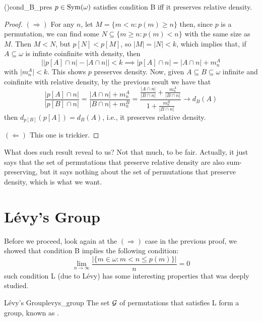 \begin{theorem}{(\cite{brech})}{cond_B_pres}
    $p\in\mathrm{Sym}(\omega)$ satisfies condition B iff it preserves relative density.
\end{theorem}

\begin{proof}
    $(\Rightarrow)$ For any $n$, let $M=\{m<n:p(m)\geq n\}$ then, since $p$ is a permutation, we can find some $N\subseteq\{m\geq n:p(m)<n\}$ with the same size as $M$. Then $M<N$, but $p[N]<p[M]$, so $\lvert M\rvert=\lvert N\rvert<k$, which implies that, if $A\subseteq\omega$ is infinte coinfinite with density, then
    $$\lvert\lvert p[A]\cap n\rvert-\lvert A\cap n\rvert\rvert<k\implies \lvert p[A]\cap n\rvert=\lvert A\cap n\rvert+m_n^A$$
    with $\lvert m_n^A\rvert<k$. This shows $p$ preserves density. Now, given $A\subseteq B\subseteq \omega$ infinite and coinfinite with relative density, by the previous result we have that
    $$\frac{\lvert p[A]\cap n\rvert}{\lvert p[B]\cap n\rvert}=\frac{\lvert A\cap n\rvert+m_n^A}{\lvert B\cap n\rvert+m_n^B}=\frac{\frac{\lvert A\cap n\rvert}{\lvert B\cap n\rvert}+\frac{m_n^A}{\lvert B\cap n\rvert}}{1+\frac{m_n^B}{\lvert B\cap n\rvert}}\to d_B(A)$$
    then $d_{p[B]}(p[A])=d_B(A)$, i.e., it preserves relative density.

    $(\Leftarrow)$ \textcolor{laser_eyes}{This one is trickier.}
\end{proof}

What does such result reveal to us? Not that much, to be fair. Actually, it just says that the set of permutations that preserve relative density are also sum-preserving, but it says nothing about the set of permutations that preserve density, which is what we want.

\section{Lévy's Group}

Before we proceed, look again at the $(\Rightarrow)$ case in the previous proof, we showed that condition B implies the following condition:
\begin{equation}\tag{L}
    \lim_{n\to\infty}\frac{\lvert\{m\in\omega:m<n\leq p(m)\}\rvert}{n}=0
\end{equation}
such condition L (due to Lévy) has some interesting properties that was deeply studied.

\begin{definition}{Lévy's Group}{levys_group}
    The set $\mathcal{G}$ of permutations that satisfies L form a group, known as .
\end{definition}

